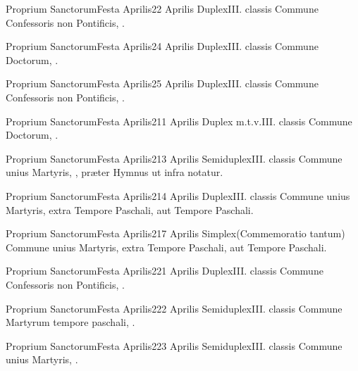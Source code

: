 \documentclass[nocturnale-romanum.tex]{subfiles}
\begin{document}

	{Proprium Sanctorum}{Festa Aprilis}{2}{2 Aprilis}
	{Duplex}{III. classis}
	{Commune Confessoris non Pontificis, \pageref{M-CONP}.}
	{}

	{Proprium Sanctorum}{Festa Aprilis}{2}{4 Aprilis}
	{Duplex}{III. classis}
	{Commune Doctorum, \pageref{M-CODO}.}
	{}

	{Proprium Sanctorum}{Festa Aprilis}{2}{5 Aprilis}
	{Duplex}{III. classis}
	{Commune Confessoris non Pontificis, \pageref{M-CONP}.}
	{}

	{Proprium Sanctorum}{Festa Aprilis}{2}{11 Aprilis}
	{Duplex m.t.v.}{III. classis}
	{Commune Doctorum, \pageref{M-CODO}.}
	{}

	{Proprium Sanctorum}{Festa Aprilis}{2}{13 Aprilis}
	{Semiduplex}{III. classis}
	{Commune unius Martyris, \pageref{M-UMEX}, præter Hymnus ut infra notatur.}
	{}

	{Proprium Sanctorum}{Festa Aprilis}{2}{14 Aprilis}
	{Duplex}{III. classis}
	{Commune unius Martyris, \pageref{M-UMEX} extra Tempore Paschali, aut \pageref{M-UMTP} Tempore Paschali.}
	{}

	{Proprium Sanctorum}{Festa Aprilis}{2}{17 Aprilis}
	{Simplex}{(Commemoratio tantum)}
	{Commune unius Martyris, \pageref{M-UMEX} extra Tempore Paschali, aut \pageref{M-UMTP} Tempore Paschali.}
	{}

	{Proprium Sanctorum}{Festa Aprilis}{2}{21 Aprilis}
	{Duplex}{III. classis}
	{Commune Confessoris non Pontificis, \pageref{M-CONP}.}
	{}

	{Proprium Sanctorum}{Festa Aprilis}{2}{22 Aprilis}
	{Semiduplex}{III. classis}
	{Commune Martyrum tempore paschali, \pageref{M-PMTP}.}
	{}

	{Proprium Sanctorum}{Festa Aprilis}{2}{23 Aprilis}
	{Semiduplex}{III. classis}
	{Commune unius Martyris, \pageref{M-UMTP}.}
	{}
\end{document}
